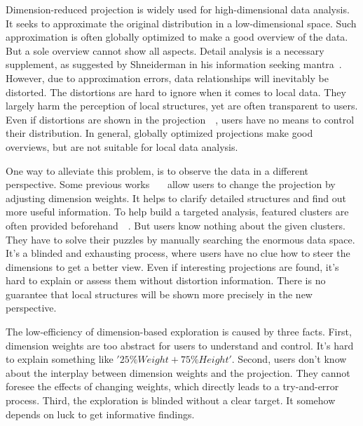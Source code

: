 \maketitle
Dimension-reduced projection is widely used for high-dimensional data analysis. It seeks to approximate the original distribution in a low-dimensional space. Such approximation is often globally optimized to make a good overview of the data. But a sole overview cannot show all aspects. Detail analysis is a necessary supplement, as suggested by Shneiderman in his information seeking mantra~\cite{DBLP:conf/vl/Shneiderman96}. However, due to approximation errors, data relationships will inevitably be distorted. The distortions are hard to ignore when it comes to local data. They largely harm the perception of local structures, yet are often transparent to users. Even if distortions are shown in the projection~\cite{DBLP:journals/tvcg/StahnkeDMT16}~\cite{DBLP:journals/ijon/Aupetit07}, users have no means to control their distribution. In general, globally optimized projections make good overviews, but are not suitable for local data analysis.

One way to alleviate this problem, is to observe the data in a different perspective. Some previous works~\cite{DBLP:journals/cgf/JeongZFRC09}~\cite{DBLP:journals/tvcg/NamM13}~\cite{DBLP:journals/tvcg/LehmannT13} allow users to change the projection by adjusting dimension weights. It helps to clarify detailed structures and find out more useful information. To help build a targeted analysis, featured clusters are often provided beforehand~\cite{DBLP:journals/tvcg/NamM13}~\cite{DBLP:journals/cgf/LiuWTBP15}. But users know nothing about the given clusters. They have to solve their puzzles by manually searching the enormous data space. It's a blinded and exhausting process, where users have no clue how to steer the dimensions to get a better view. Even if interesting projections are found, it's hard to explain or assess them without distortion information. There is no guarantee that local structures will be shown more precisely in the new perspective.

The low-efficiency of dimension-based exploration is caused by three facts. First, dimension weights are too abstract for users to understand and control. It's hard to explain something like $'25\% Weight + 75\% Height'$. Second, users don't know about the interplay between dimension weights and the projection. They cannot foresee the effects of changing weights, which directly leads to a try-and-error process. Third, the exploration is blinded without a clear target. It somehow depends on luck to get informative findings.

